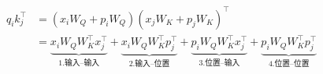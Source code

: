 \begin{align*}
    q_i k_j^\top
        &= (x_i W_Q + p_i W_Q)(x_j W_K + p_j W_K)^\top
    
    \\
        &= \underbrace{x_i W_Q W_K^\top x_j^\top}_{\text{1.输入–输入}}
        + \underbrace{x_i W_Q W_K^\top p_j^\top}_{\text{2.输入–位置}}
        + \underbrace{p_i W_Q W_K^\top x_j^\top}_{\text{3.位置–输入}}
        + \underbrace{p_i W_Q W_K^\top p_j^\top}_{\text{4.位置–位置}}
\end{align*}